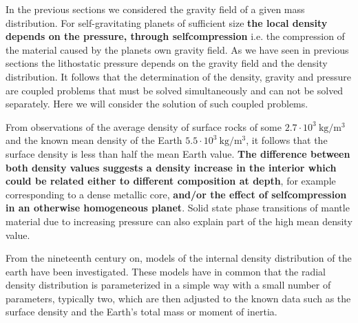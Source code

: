 
In the previous sections we considered the gravity field of a given
mass distribution.
For self-gravitating planets of sufficient size {\bf the local
density depends on the pressure, through selfcompression} i.e.
the compression of the material caused by the planets own gravity field.
As we have seen in previous sections the lithostatic pressure
depends on the gravity field and the density distribution. 
It follows that the determination of the density, gravity and
pressure are coupled problems that must be solved simultaneously
and can not be solved separately.
Here we will consider the solution of such coupled problems.

From observations of the average density of surface rocks of some
$2.7 \cdot 10^3~\mathrm{kg/m^3}$ 
and the known mean density of the Earth 
$5.5 \cdot 10^3~\mathrm{kg/m^3}$, 
it follows that the surface density is less than half the 
mean Earth value.
{\bf The difference between both density values suggests a density increase
in the interior which could be related either to different composition at depth}, 
for example corresponding to a dense metallic core, 
{\bf and/or the effect of selfcompression in an otherwise 
homogeneous planet}. 
Solid state phase transitions of mantle material due to increasing pressure
can also explain part of the high mean density value.

From the nineteenth century on, models of the internal density 
distribution of the earth have been investigated. 
These models have in common that the radial density distribution is 
parameterized in a simple way with a small number of parameters,
typically two, which are then adjusted to the known data such as 
the surface density and the Earth's total mass or moment of inertia.




